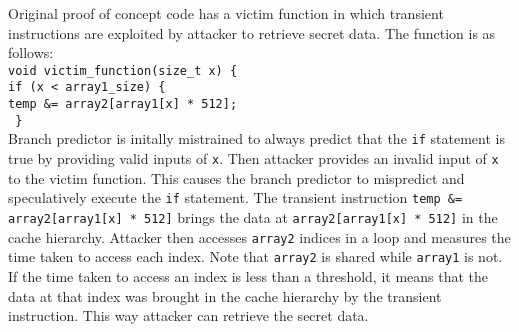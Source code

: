 Original proof of concept code has a victim function in which transient instructions are exploited by attacker to retrieve secret data. The function is as follows: \\
\texttt{void victim\_function(size\_t x) \{ }\\
\indent  \texttt{if (x < array1\_size) \{} \\
\indent	\indent	\texttt{temp \&= array2[array1[x] * 512];} \\
\texttt{	\} }\\
\indent Branch predictor is initally mistrained to always predict that the \texttt{if} statement is true by providing valid inputs of \texttt{x}. Then attacker provides an invalid input of \texttt{x} to the victim function. This causes the branch predictor to mispredict and speculatively execute the \texttt{if} statement. The transient instruction \texttt{temp \&= array2[array1[x] * 512]} brings the data at \texttt{array2[array1[x] * 512]} in the cache hierarchy. Attacker then accesses \texttt{array2} indices in a loop and measures the time taken to access each index. Note that \texttt{array2} is shared while \texttt{array1} is not. If the time taken to access an index is less than a threshold, it means that the data at that index was brought in the cache hierarchy by the transient instruction. This way attacker can retrieve the secret data. \\